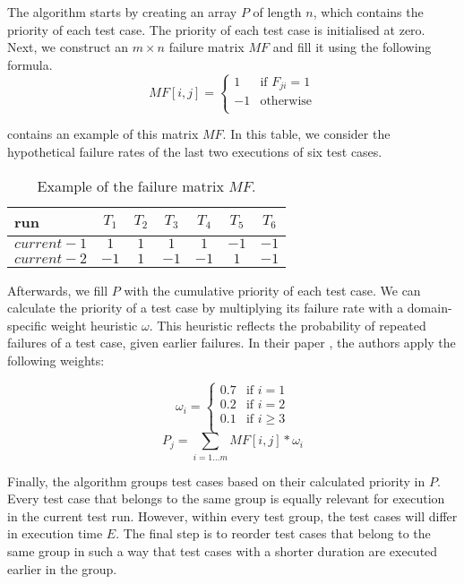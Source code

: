\noindent The algorithm starts by creating an array $P$ of length $n$, which contains the priority of each test case. The priority of each test case is initialised at zero. Next, we construct an $m \times n$ failure matrix $MF$ and fill it using the following formula.
\[
	MF[i, j] = \left\{
	\begin{array}{rl}
		1 & \text{if } F_{ji} = 1 \\
		-1 & \text{otherwise} \\
		\end{array}
	\right.
\]

\noindent {} contains an example of this matrix $MF$. In this table, we consider the hypothetical failure rates of the last two executions of six test cases.

\begin{table}[h]
\centering
\begin{tabular}{| l || c | c | c | c | c | c |}
	\hline
	\textbf{run} & \textbf{$T_1$} & \textbf{$T_2$} & \textbf{$T_3$} & \textbf{$T_4$} & \textbf{$T_5$} & \textbf{$T_6$}\\\hline
	$current - 1$ & $1$ & $1$ & $1$ & $1$ & $-1$ & $-1$\\
	$current - 2$ & $-1$ & $1$ & $-1$ & $-1$ & $1$ & $-1$\\
	\hline
\end{tabular}
\caption{Example of the failure matrix $MF$.}
\label{tbl:rocket-failurematrix}
\end{table}

\noindent Afterwards, we fill $P$ with the cumulative priority of each test case. We can calculate the priority of a test case by multiplying its failure rate with a domain-specific weight heuristic $\omega$. This heuristic reflects the probability of repeated failures of a test case, given earlier failures. In their paper \cite{6676952}, the authors apply the following weights:

\[
	\omega_i = \left.
	\begin{cases}
		0.7 & \text{if } i = 1 \\
		0.2 & \text{if } i = 2 \\
		0.1 & \text{if } i \ge 3 \\
	\end{cases}
	\right.
\]
$$P_j = \sum_{i = 1 \dots m} MF[i, j] * \omega_i$$

\noindent Finally, the algorithm groups test cases based on their calculated priority in $P$. Every test case that belongs to the same group is equally relevant for execution in the current test run. However, within every test group, the test cases will differ in execution time $E$. The final step is to reorder test cases that belong to the same group in such a way that test cases with a shorter duration are executed earlier in the group.

